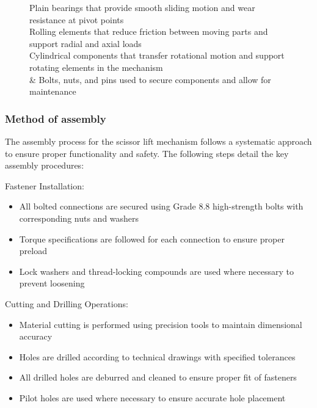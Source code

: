 \documentclass[../../main]{subfiles}
\begin{document}
\begin{figure}[h]
\begin{subfigure}[b]{0.495\textwidth}
  \caption[short]{}
  \label{e}
\end{subfigure}
\caption[Key Components of the Mechanism]{
 Plain bearings that provide smooth sliding motion and wear resistance at pivot points\\
 Rolling elements that reduce friction between moving parts and support radial and axial loads\\
 Cylindrical components that transfer rotational motion and support rotating elements in the mechanism\\
 \&  Bolts, nuts, and pins used to secure components and allow for maintenance\\
} 
\end{figure}
\newpage
\subsubsection{Method of assembly}\label{method-of-assembly}

The assembly process for the scissor lift mechanism follows a systematic
approach to ensure proper functionality and safety. The following steps
detail the key assembly procedures:

Fastener Installation:

\begin{itemize}
\item
  All bolted connections are secured using Grade 8.8 high-strength bolts
  with corresponding nuts and washers
\item
  Torque specifications are followed for each connection to ensure
  proper preload
\item
  Lock washers and thread-locking compounds are used where necessary to
  prevent loosening
\end{itemize}

Cutting and Drilling Operations:

\begin{itemize}
\item
  Material cutting is performed using precision tools to maintain
  dimensional accuracy
\item
  Holes are drilled according to technical drawings with specified
  tolerances
\item
  All drilled holes are deburred and cleaned to ensure proper fit of
  fasteners
\item
  Pilot holes are used where necessary to ensure accurate hole placement
\end{itemize}
\end{document}
